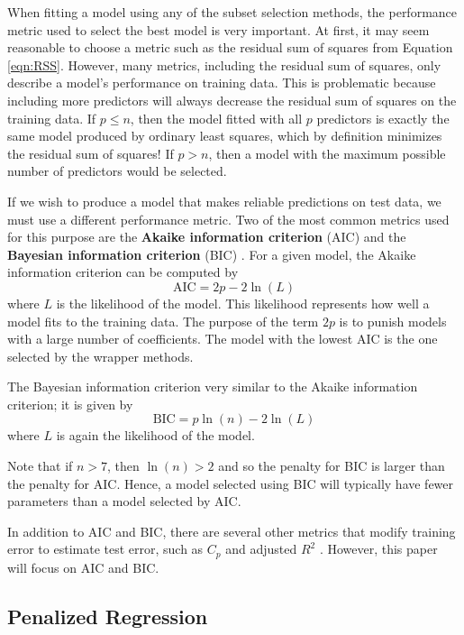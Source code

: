 \documentclass{article}
\begin{document}
When fitting a model using any of the subset selection methods, the performance metric used to select the best model is very important. At first, it may seem reasonable to choose a metric such as the residual sum of squares from Equation \ref{eqn:RSS}. However, many metrics, including the residual sum of squares, only describe a model's performance on training data. This is problematic because including more predictors will always decrease the residual sum of squares on the training data. If $p\leq n$, then the model fitted with all $p$ predictors is exactly the same model produced by ordinary least squares, which by definition minimizes the residual sum of squares! If $p>n$, then a model with the maximum possible number of predictors would be selected.

If we wish to produce a model that makes reliable predictions on test data, we must use a different performance metric. Two of the most common metrics used for this purpose are the \textbf{Akaike information criterion} (AIC) and the \textbf{Bayesian information criterion} (BIC) \cite{akaike1998information, schwarz1978estimating}. For a given model, the Akaike information criterion can be computed by
\begin{equation}
	\text{AIC} = 2p - 2\ln(L)
\end{equation}
where $L$ is the likelihood of the model. This likelihood represents how well a model fits to the training data. The purpose of the term $2p$ is to punish models with a large number of coefficients. The model with the lowest AIC is the one selected by the wrapper methods.

The Bayesian information criterion very similar to the Akaike information criterion; it is given by
\begin{equation}
	\text{BIC} = p\ln(n) - 2\ln(L)
\end{equation}
where $L$ is again the likelihood of the model.

Note that if $n>7$, then $\ln(n)>2$ and so the penalty for BIC is larger than the penalty for AIC. Hence, a model selected using BIC will typically have fewer parameters than a model selected by AIC.

In addition to AIC and BIC, there are several other metrics that modify training error to estimate test error, such as $C_p$ and adjusted $R^2$ \cite{james2013introduction}. However, this paper will focus on AIC and BIC.
\subsection{Penalized Regression}
\end{document}
